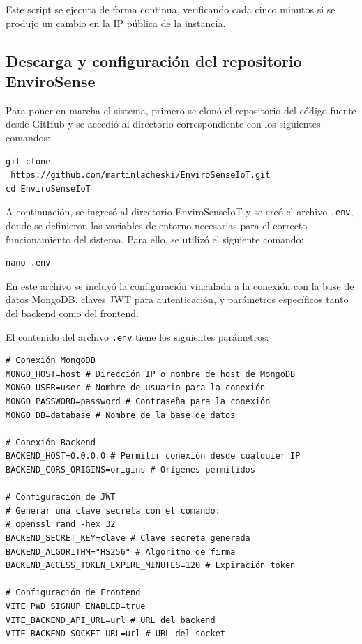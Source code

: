 Este script se ejecuta de forma continua, verificando cada cinco minutos si se
produjo un cambio en la IP pública de la instancia.

\subsection{Descarga y configuración del repositorio EnviroSense}

Para poner en marcha el sistema, primero se clonó el repositorio del código
fuente desde GitHub y se accedió al directorio correspondiente con los
siguientes comandos:

\begin{verbatim}
git clone 
 https://github.com/martinlacheski/EnviroSenseIoT.git
cd EnviroSenseIoT
\end{verbatim}

A continuación, se ingresó al directorio EnviroSenseIoT y se creó el archivo
\texttt{.env}, donde se definieron las variables de entorno necesarias para el
correcto funcionamiento del sistema. Para ello, se utilizó el siguiente
comando:

\begin{verbatim}
nano .env
\end{verbatim}

En este archivo se incluyó la configuración vinculada a la conexión con la base
de datos MongoDB, claves JWT para autenticación, y parámetros específicos tanto
del backend como del frontend.

El contenido del archivo \texttt{.env} tiene los siguientes parámetros:
\begin{verbatim}
# Conexión MongoDB
MONGO_HOST=host # Dirección IP o nombre de host de MongoDB
MONGO_USER=user # Nombre de usuario para la conexión
MONGO_PASSWORD=password # Contraseña para la conexión
MONGO_DB=database # Nombre de la base de datos
    
# Conexión Backend
BACKEND_HOST=0.0.0.0 # Permitir conexión desde cualquier IP
BACKEND_CORS_ORIGINS=origins # Orígenes permitidos
    
# Configuración de JWT
# Generar una clave secreta con el comando: 
# openssl rand -hex 32
BACKEND_SECRET_KEY=clave # Clave secreta generada
BACKEND_ALGORITHM="HS256" # Algoritmo de firma
BACKEND_ACCESS_TOKEN_EXPIRE_MINUTES=120 # Expiración token

# Configuración de Frontend
VITE_PWD_SIGNUP_ENABLED=true
VITE_BACKEND_API_URL=url # URL del backend
VITE_BACKEND_SOCKET_URL=url # URL del socket
\end{verbatim}

